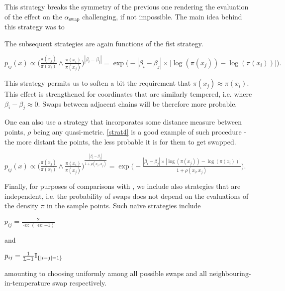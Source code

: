 \documentclass{article}
\begin{document}
This strategy breaks the symmetry of the previous one rendering the evaluation of the effect on the $\alpha_\text{swap}$ challenging, if not impossible. The main idea behind this strategy was to  


The subsequent strategies are again functions of the fist strategy.

\begin{strategy}[resume]
	\item 
		$p_{ij}(x) \propto 
			\Big( \frac{\pi (x_j)}{\pi( x_i )} \wedge 
			\frac{\pi (	x_i)}{\pi( x_j )} \Big)^{|\beta_i - \beta_j|} = 
		\exp \Big( - |\beta_i - \beta_j| \times \big| \log ( \pi(x_j) ) - \log ( \pi(x_i) ) \big| \Big).$\label{strat3} 
\end{strategy}

This strategy permits us to soften a bit the requirement that $\pi(x_j) \approx \pi (x_i)$. This effect is strengthened for coordinates that are similarly tempered, i.e. where $\beta_i - \beta_j \approx 0$. Swaps between adjacent chains will be therefore more probable. 

One can also use a strategy that incorporates some distance measure between points, $\rho$ being any quasi-metric. \ref{strat4} is a good example of such procedure - the more distant the points, the less probable it is for them to get swapped.  

\begin{strategy}[resume]
	\item 
		$p_{ij}(x) \propto \Big( \frac{\pi (x_j)}{\pi( x_i )} \wedge \frac{\pi (x_i)}{\pi( x_j )} \Big)^\frac{|\beta_i - \beta_j|}{1 + \rho(x_i, x_j)} = \exp \Big( - \frac{|\beta_i - \beta_j| \times | \log ( \pi(x_j) ) - \log ( \pi(x_i) ) |}{{1 + \rho(x_i, x_j)}} \Big).$\label{strat4}
\end{strategy} 

Finally, for purposes of comparisons with \citet{BaragattiParallelTemperingWithEquiEnergyMoves}, we include also strategies that are \sspace\, independent, i.e. the probability of swaps does not depend on the evaluations of the density $\pi$ in the sample points. Such na\"ive strategies include 

\begin{strategy}[resume]
	\item $p_{ij} = \frac{2}{\lll (\lll - 1)}$\label{strat5}
\end{strategy}

and 

\begin{strategy}[resume]
	\item $p_{ij} = \frac{1}{\mathrm{L} - 1} \mathbb{I}_{ \{|i-j|=1\} }$\label{strat6}
\end{strategy}

amounting to choosing uniformly among all possible swaps and all neighbouring-in-temperature swap respectively. 












	
	
\end{document}
